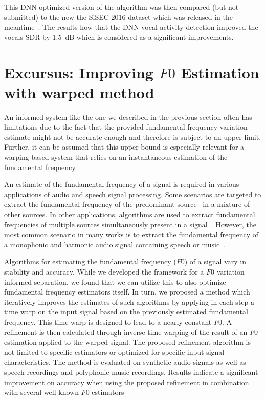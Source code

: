 This DNN-optimized version of the algorithm was then compared (but not submitted) to the new the SiSEC 2016 dataset which was released in the meantime~\cite{liutkus17}.
The results how that the DNN vocal activity detection improved the vocals SDR by 1.5~dB which is considered as a significant improvements.

\section{Excursus: Improving $F0$ Estimation with warped method} %
\label{sec:method}




An informed system like the one we described in the previous section often has limitations due to the fact that the provided fundamental frequency variation estimate might not be accurate enough and therefore is subject to an upper limit.
Further, it can be assumed that this upper bound is especially relevant for a warping based system that relies on an instantaneous estimation of the fundamental frequency.
\par
An estimate of the fundamental frequency of a signal is required in various applications of audio and speech signal processing.
Some scenarios are targeted to extract the fundamental frequency of the predominant source~\cite{salamon12} in a mixture of other sources.
In other applications, algorithms are used to extract fundamental frequencies of multiple sources simultaneously present in a signal~\cite{klapuri03}.
However, the most common scenario in many works is to extract the fundamental frequency of a monophonic and harmonic audio signal containing speech or music~\cite{talkin95, boersma02, decheveigne02, resch07, tidhar10, christensen07}.
\par
Algorithms for estimating the fundamental frequency ($F0$) of a signal vary in stability and accuracy.
While we developed the framework for a $F0$ variation informed separation, we found that we can utilize this to also optimize fundamental frequency estimators itself.
In turn, we proposed a method which iteratively improves the estimates of such algorithms by applying in each step a time warp on the input signal based on the previously estimated fundamental frequency.
This time warp is designed to lead to a nearly constant $F0$. A refinement is then calculated through inverse time warping of the result of an $F0$ estimation applied to the warped signal. The proposed refinement algorithm is not limited to specific estimators or optimized for specific input signal characteristics. The method is evaluated on synthetic audio signals as well as speech recordings and polyphonic music recordings. Results indicate a significant improvement on accuracy when using the proposed refinement in combination with several well-known $F0$ estimators


